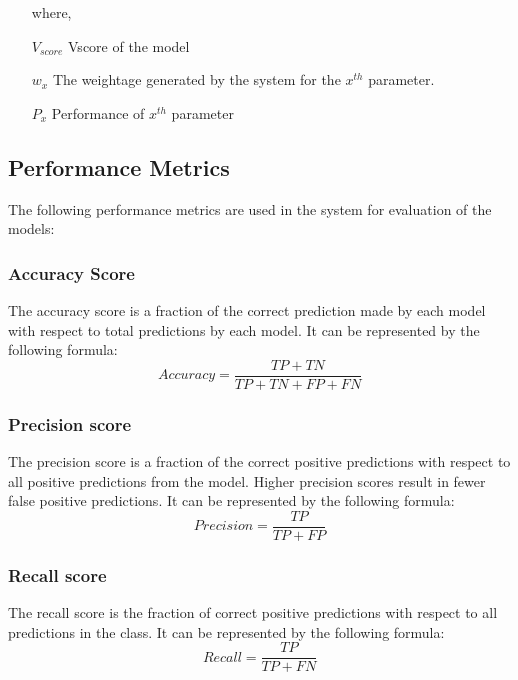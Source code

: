 {\responsemod
\begin{itemize}
    \item[where,]
    \item[$V_{score}$] Vscore of the model
    \item[$w_x$] The weightage generated by the system for the $x^{th}$ parameter.
    \item[$P_x$] Performance of $x^{th}$ parameter
\end{itemize}

\subsection{Performance Metrics} \label{subsec:performance_metrics}
The following performance metrics are used in the system for evaluation of the models:

\subsubsection{Accuracy Score}\label{subsubsec:accuracy_score}
The accuracy score is a fraction of the correct prediction made by each model with respect to total predictions by each model. It can be represented by the following formula:
\begin{equation*}\label{eq:accuracy_score}
    Accuracy = \frac{TP+TN}{TP+TN+FP+FN}
\end{equation*}

\subsubsection{Precision score}\label{subsubsec:precision_score}
The precision score is a fraction of the correct positive predictions with respect to all positive predictions from the model. Higher precision scores result in fewer false positive predictions. It can be represented by the following formula:
\begin{equation*}\label{eq:precision_score}
    Precision = \frac{TP}{TP+FP}
\end{equation*}

\subsubsection{Recall score}\label{subsubsec:recall_score}
The recall score is the fraction of correct positive predictions with respect to all predictions in the class. It can be represented by the following formula:
\begin{equation*}\label{eq:recall_score}
    Recall = \frac{TP}{TP+FN}
\end{equation*}

}
